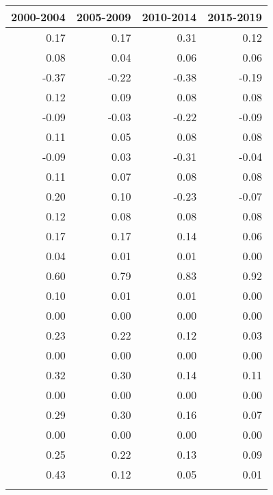 \begin{table}[ht]
\centering
\begin{tabular}{rrrr}
  \hline
2000-2004 & 2005-2009 & 2010-2014 & 2015-2019 \\ 
  \hline
0.17 & 0.17 & 0.31 & 0.12 \\ 
  0.08 & 0.04 & 0.06 & 0.06 \\ 
  -0.37 & -0.22 & -0.38 & -0.19 \\ 
  0.12 & 0.09 & 0.08 & 0.08 \\ 
  -0.09 & -0.03 & -0.22 & -0.09 \\ 
  0.11 & 0.05 & 0.08 & 0.08 \\ 
  -0.09 & 0.03 & -0.31 & -0.04 \\ 
  0.11 & 0.07 & 0.08 & 0.08 \\ 
  0.20 & 0.10 & -0.23 & -0.07 \\ 
  0.12 & 0.08 & 0.08 & 0.08 \\ 
  0.17 & 0.17 & 0.14 & 0.06 \\ 
  0.04 & 0.01 & 0.01 & 0.00 \\ 
  0.60 & 0.79 & 0.83 & 0.92 \\ 
  0.10 & 0.01 & 0.01 & 0.00 \\ 
  0.00 & 0.00 & 0.00 & 0.00 \\ 
  0.23 & 0.22 & 0.12 & 0.03 \\ 
  0.00 & 0.00 & 0.00 & 0.00 \\ 
  0.32 & 0.30 & 0.14 & 0.11 \\ 
  0.00 & 0.00 & 0.00 & 0.00 \\ 
  0.29 & 0.30 & 0.16 & 0.07 \\ 
  0.00 & 0.00 & 0.00 & 0.00 \\ 
  0.25 & 0.22 & 0.13 & 0.09 \\ 
  0.43 & 0.12 & 0.05 & 0.01 \\ 
   &  &  &  \\ 
   \hline
\end{tabular}
\end{table}
